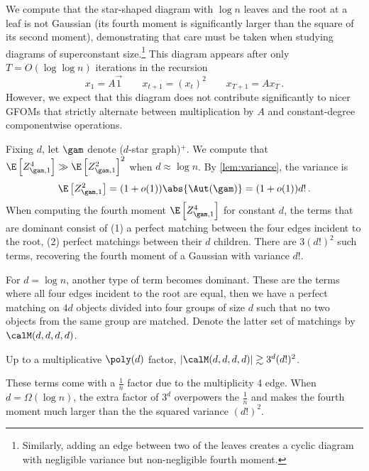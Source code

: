 \documentclass[12pt]{article}
\begin{document}
We compute that the star-shaped diagram with $\log n$
leaves and the root at a leaf is not Gaussian
(its fourth moment is significantly larger than the square of its second moment), demonstrating that care must be taken when studying diagrams of superconstant size.\footnote{Similarly, adding an edge between two of the leaves creates a cyclic diagram with negligible variance but non-negligible fourth moment.}
This diagram appears after only $T = O(\log \log n)$ iterations in 
the recursion
\[x_1 = A \vec{1} \qquad x_{t+1} = (x_t)^2 \qquad x_{T+1} = A x_T\,.\]
However, we expect that this diagram does not contribute significantly to nicer GFOMs that strictly alternate between multiplication by $A$ and constant-degree componentwise operations.


Fixing $d$, let $\gam$ denote ($d$-star graph)$^+$.
We compute that $\E\left[Z_{\gam,1}^4\right] \gg \E\left[Z_{\gam,1}^2\right]^2$ when $d \approx \log n$.
By \cref{lem:variance}, the variance is
\[\E\left[Z_{\gam, 1}^2\right] = (1+o(1))\abs{\Aut(\gam)} = (1+o(1))d!\,.\]
When computing the fourth moment $\E\left[Z_{\gam, 1}^4\right]$ for constant $d$, the terms that are dominant
consist of (1) a perfect matching between the four edges incident to the root, (2) perfect matchings between their $d$ children.
There are $3(d!)^2$ such terms, recovering the fourth moment of a Gaussian with variance $d!$.

For $d = \log n$, another type of term becomes dominant.
These are the terms where all four edges incident to the root are equal,
then we have a perfect matching on $4d$ objects divided into four groups
of size $d$ such that no two objects from the same group are matched.
Denote the latter set of matchings by $\calM(d,d,d,d)$.
\begin{lemma}\label{lem:four-matchings}
    Up to a multiplicative $\poly(d)$ factor, $|\calM(d,d,d,d)| \gtrsim 3^d (d!)^2$.
\end{lemma}
These terms come with a $\frac 1 n$ factor due to the multiplicity 4 edge.
When $d = \Omega(\log n)$, the extra factor of $3^d$ overpowers the $\frac 1 n$ and makes the fourth moment much larger than the
the squared variance $(d!)^2$.
\end{document}
